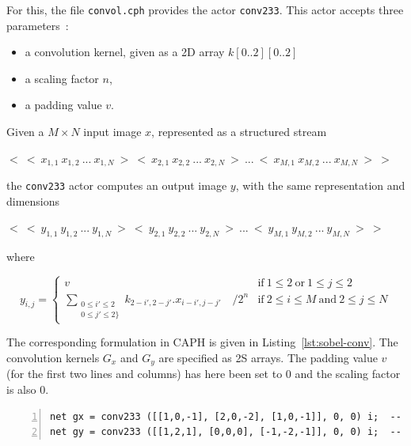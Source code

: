 For this, the file \verb|convol.cph| provides the actor \verb|conv233|. This actor accepts three
parameters~:
\begin{itemize}
\item a convolution kernel, given as a 2D array $k[0..2][0..2]$
\item a scaling factor $n$,
\item a padding value $v$.
\end{itemize}
Given a $M\times N$ input image $x$, represented as a structured stream 

\begin{center}
\begin{math}
<\ <\ x_{1,1}\ x_{1,2}\ ...\ x_{1,N}\ >\ <\ x_{2,1}\ x_{2,2}\ ...\ x_{2,N}\ >\ ...\ <\ x_{M,1}\ x_{M,2}\ ...\ x_{M,N}\ >\ >
\end{math}
\end{center}

\noindent
the \verb|conv233| actor computes an output image $y$, with the same representation and dimensions

\begin{center}
\begin{math}
<\ <\ y_{1,1}\ y_{1,2}\ ...\ y_{1,N}\ >\ <\ y_{2,1}\ y_{2,2}\ ...\ y_{2,N}\ >\ ...\ <\ y_{M,1}\ y_{M,2}\ ...\ y_{M,N}\ >\ >
\end{math}
\end{center}

\noindent
where 

\begin{equation}
y_{i,j} = 
\begin{cases}
v & \text{if}\ 1 \leq 2\ \text{or}\ 1 \leq j \leq 2 \\
\sum\limits_{\substack{0\leq i'\leq 2\\ 0\leq j'\leq 2\}}} k_{2-i',2-j'}.x_{i-i',j-j'}\quad /2^n & \text{if}\ 2\leq i\leq M\ \text{and}\ 2\leq j \leq N
\end{cases}
\label{eq:conv233}
\end{equation}

The corresponding formulation in CAPH is given in Listing~\ref{lst:sobel-conv}. The convolution
kernels $G_x$ and $G_y$ are specified as 2S arrays. The padding value $v$
(for the first two lines and columns) has here been set to 0 and the scaling factor is also 0.

\begin{lstlisting}[style=CaphStyle,numbers=left,numberstyle=\tiny,caption={Computation of the
    gradient components using the \texttt{conv233} actor of the standard CAPH library},label={lst:sobel-conv}]
net gx = conv233 ([[1,0,-1], [2,0,-2], [1,0,-1]], 0, 0) i;  -- grad x component
net gy = conv233 ([[1,2,1], [0,0,0], [-1,-2,-1]], 0, 0) i;  -- grad y component
\end{lstlisting}

